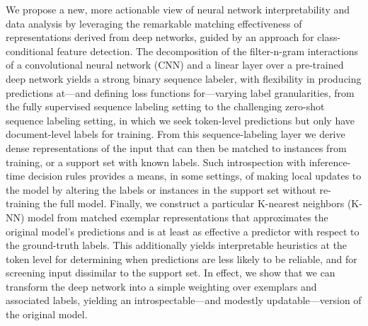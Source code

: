 We propose a new, more actionable view of neural network interpretability and data analysis by leveraging the remarkable matching effectiveness of representations derived from deep networks, guided by an approach for class-conditional feature detection. The decomposition of the filter-n-gram interactions of a convolutional neural network (CNN) and a linear layer over a pre-trained deep network yields a strong binary sequence labeler, with flexibility in producing predictions at—and defining loss functions for—varying label granularities, from the fully supervised sequence labeling setting to the challenging zero-shot sequence labeling setting, in which we seek token-level predictions but only have document-level labels for training. From this sequence-labeling layer we derive dense representations of the input that can then be matched to instances from training, or a support set with known labels. Such introspection with inference-time decision rules provides a means, in some settings, of making local updates to the model by altering the labels or instances in the support set without re-training the full model. Finally, we construct a particular K-nearest neighbors (K-NN) model from matched exemplar representations that approximates the original model's predictions and is at least as effective a predictor with respect to the ground-truth labels. This additionally yields interpretable heuristics at the token level for determining when predictions are less likely to be reliable, and for screening input dissimilar to the support set. In effect, we show that we can transform the deep network into a simple weighting over exemplars and associated labels, yielding an introspectable—and modestly updatable—version of the original model.